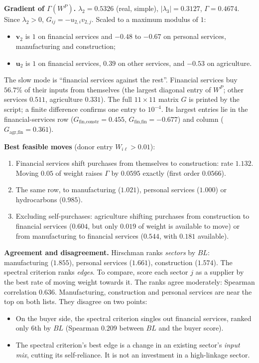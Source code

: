 \documentclass[../solutions_manual.tex]{subfiles}
\begin{document}
 \textbf{Gradient of $\Gamma(W^P)$.} $\lambda_2 = 0.5326$ (real, simple), $|\lambda_3| = 0.3127$, $\Gamma = 0.4674$. Since $\lambda_2 > 0$, $G_{ij} = -u_{2,i}v_{2,j}$. Scaled to a maximum modulus of $1$:
\begin{itemize}
\item $\mathbf{v}_2$ is $1$ on financial services and $-0.48$ to $-0.67$ on personal services, manufacturing and construction;
\item $\mathbf{u}_2$ is $1$ on financial services, $0.39$ on other services, and $-0.53$ on agriculture.
\end{itemize}
The slow mode is ``financial services against the rest''. Financial services buy $56.7\%$ of their inputs from themselves (the largest diagonal entry of $W^P$; other services $0.511$, agriculture $0.331$). The full $11 \times 11$ matrix $G$ is printed by the script; a finite difference confirms one entry to $10^{-4}$. Its largest entries lie in the financial-services row ($G_{\text{fin},\text{constr}} = 0.455$, $G_{\text{fin},\text{fin}} = -0.677$) and column ($G_{\text{agr},\text{fin}} = 0.361$).

\textbf{Best feasible moves} (donor entry $W_{i\ell} > 0.01$):
\begin{enumerate}
\item Financial services shift purchases from themselves to construction: rate $1.132$. Moving $0.05$ of weight raises $\Gamma$ by $0.0595$ exactly (first order $0.0566$).
\item The same row, to manufacturing ($1.021$), personal services ($1.000$) or hydrocarbons ($0.985$).
\item Excluding self-purchases: agriculture shifting purchases from construction to financial services ($0.604$, but only $0.019$ of weight is available to move) or from manufacturing to financial services ($0.544$, with $0.181$ available).
\end{enumerate}

 \textbf{Agreement and disagreement.} Hirschman ranks \emph{sectors} by $BL$: manufacturing ($1.855$), personal services ($1.661$), construction ($1.574$). The spectral criterion ranks \emph{edges}. To compare, score each sector $j$ as a supplier by the best rate of moving weight towards it. The ranks agree moderately: Spearman correlation $0.636$. Manufacturing, construction and personal services are near the top on both lists. They disagree on two points:
\begin{itemize}
\item On the buyer side, the spectral criterion singles out financial services, ranked only 6th by $BL$ (Spearman $0.209$ between $BL$ and the buyer score).
\item The spectral criterion's best edge is a change in an existing sector's \emph{input mix}, cutting its self-reliance. It is not an investment in a high-linkage sector.
\end{itemize}
\end{document}
